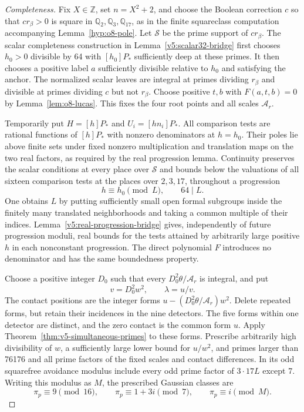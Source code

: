 \documentclass[11pt]{article}
\theoremstyle{definition}
\theoremstyle{remark}
\newcommand{\Q}{\mathbb Q}
\newcommand{\Z}{\mathbb Z}
\begin{document}
\begin{proof}[Completeness]
Fix $X\in\Z$, set $n=X^2+2$, and choose the Boolean correction
$c$ so that $cr_\beta>0$ is square in $\Q_2,\Q_3,\Q_{17}$,
as in the finite squareclass computation accompanying
Lemma~\ref{hyp:o8-pole}. Let $\mathcal S$ be the prime support of
$cr_\beta$. The scalar completeness construction in
Lemma~\ref{v5:scalar32-bridge} first chooses $h_0>0$ divisible by
64 with $[h_0]P_*$ sufficiently deep at these primes. It then
chooses a positive label $a$ sufficiently divisible relative to
$h_0$ and satisfying the anchor. The normalized scalar leaves are
integral at primes dividing $r_\beta$ and divisible at primes
dividing $c$ but not $r_\beta$. Choose positive $t,b$ with
$F(a,t,b)=0$ by Lemma~\ref{lem:o8-lucas}.
This fixes the four root points and all scales $\mathcal A_r$.

Temporarily put $H=[h]P_*$ and $U_i=[hn_i]P_*$.
All comparison tests are rational functions of $[h]P_*$ with
nonzero denominators at $h=h_0$. Their poles lie above finite
sets under fixed nonzero multiplication and translation maps
on the two real factors, as required by the real progression lemma.
Continuity preserves the scalar
conditions at every place over $\mathcal S$ and bounds below the
valuations of all sixteen comparison tests at the places over
$2,3,17$, throughout a progression
\[
 h\equiv h_0\pmod L,\qquad64\mid L.
\]
One obtains $L$ by putting sufficiently small open formal subgroups
inside the finitely many translated neighborhoods and taking a
common multiple of their indices. Lemma~\ref{v5:real-progression-bridge}
gives, independently of future progression moduli, real bounds for
the tests attained by arbitrarily large positive $h$ in each
nonconstant progression. The direct polynomial $F$ introduces
no denominator and has the same boundedness property.

Choose a positive integer $D_0$ such that every
$D_0^2\theta/\mathcal A_r$ is integral, and put
\[
 v=D_0^2w^2,\qquad\lambda=u/v.
\]
The contact positions are the integer forms
$u-(D_0^2\theta/\mathcal A_r)w^2$. Delete repeated forms, but retain
their incidences in the nine detectors. The five forms within one
detector are distinct, and the zero contact is the common form $u$.
Apply Theorem~\ref{thm:v5-simultaneous-primes} to these forms.
Prescribe arbitrarily high divisibility of $w$, a sufficiently
large lower bound for $u/w^2$, and primes larger than 76176 and
all prime factors of the fixed scales and contact differences.
In its odd squarefree avoidance modulus include every odd prime
factor of $3\cdot17L$ except 7.
Writing this modulus as $M$, the prescribed Gaussian classes are
\[
 \pi_p\equiv9\pmod{16},\qquad
 \pi_p\equiv1+3i\pmod7,\qquad
 \pi_p\equiv i\pmod M.
\]


\end{proof}
\end{document}

